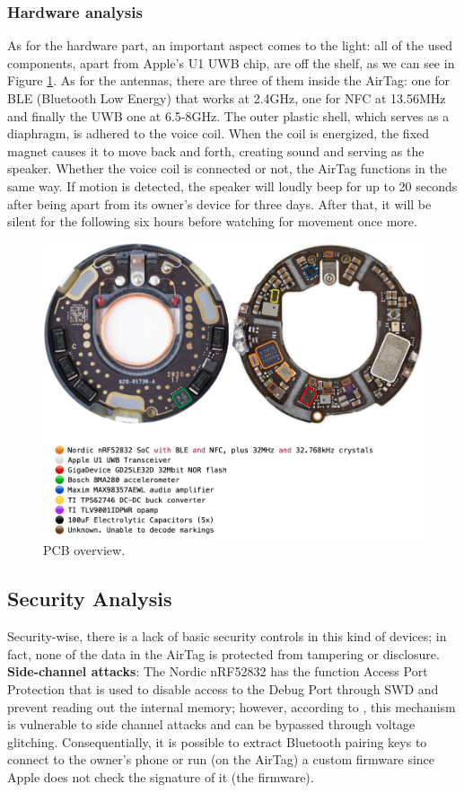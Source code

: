 \documentclass[english]{article}
\begin{document}
\subsubsection{Hardware analysis}\label{hw}
As for the hardware part, an important aspect comes to the light: all of the used components, apart from Apple's U1 UWB chip, are off the shelf, as we can see in Figure \ref{img:pcb}.
As for the antennas, there are three of them inside the AirTag: one for BLE (Bluetooth Low Energy) that works at 2.4GHz, one for NFC at 13.56MHz and finally the UWB one at 6.5-8GHz.
The outer plastic shell, which serves as a diaphragm, is adhered to the voice coil. When the coil is energized, the fixed magnet causes it to move back and forth, creating sound and serving as the speaker.
Whether the voice coil is connected or not, the AirTag functions in the same way.
If motion is detected, the speaker will loudly beep for up to 20 seconds after being apart from its owner's device for three days. After that, it will be silent for the following six hours before watching for movement once more.
\begin{figure}[]
	\centering
	\includegraphics[width=1.1\textwidth]{images/pcb.png}
	\caption{PCB overview.}
	\label{img:pcb}
\end{figure}

\subsection{Security Analysis}
Security-wise, there is a lack of basic security controls in this kind of devices; in fact, none of the data in the AirTag is protected from tampering or disclosure.
\textbf{Side-channel attacks}:
The Nordic nRF52832 has the function Access Port Protection\cite{nordicsemi} that is used to disable access to the Debug Port through SWD and prevent reading out the internal memory; however, according to \cite{side}, this mechanism is vulnerable to side channel attacks and can be bypassed through voltage glitching. Consequentially, it is possible to extract Bluetooth pairing keys to connect to the owner’s phone or run (on the AirTag) a custom firmware since Apple does not check the signature of it (the firmware).
\end{document}
